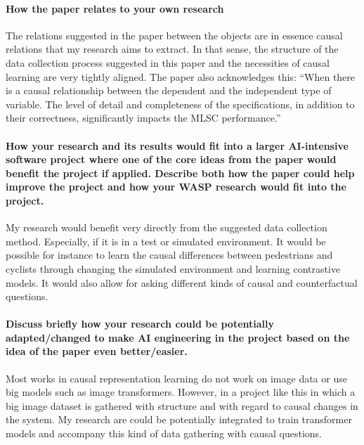 \documentclass[pra, onecolumn,superscriptaddress,nofootinbib]{revtex4}
\begin{document}
\paragraph{How the paper relates to your own research\\}
    The relations suggested in the paper between the objects are in essence causal relations that my research aims to extract. In that sense, the structure of the data collection process suggested in this paper and the necessities of causal learning are very tightly aligned. The paper also acknowledges this: ``When there is a causal relationship between the dependent and the independent type of variable. The level of detail and completeness of the specifications, in addition to their correctness, significantly impacts the MLSC performance.'' \cite{software2}
  
  
\paragraph{How your research and its results would fit into a larger AI-intensive software project where one of the core ideas from the paper would benefit the project if applied. Describe both how the paper could help improve the project and how your WASP research would fit into the project.\\}

    My research would benefit very directly from the suggested data collection method. Especially, if it is in a test or simulated environment. It would be possible for instance to learn the causal differences between pedestrians and cyclists through changing the simulated environment and learning contrastive models. It would also allow for asking different kinds of causal and counterfactual questions.

  
\paragraph{Discuss briefly how your research could be potentially adapted/changed to make AI engineering in the project based on the idea of the paper even better/easier.\\}

    Most works in causal representation learning do not work on image data or use big models such as image transformers. However, in a project like this in which a big image dataset is gathered with structure and with regard to causal changes in the system. My research are could be potentially integrated to train transformer models and accompany this kind of data gathering with causal questions.



\let\oldaddcontentsline\addcontentsline%
\renewcommand{\addcontentsline}[3]{}%

\let\addcontentsline\oldaddcontentsline%
\end{document}
